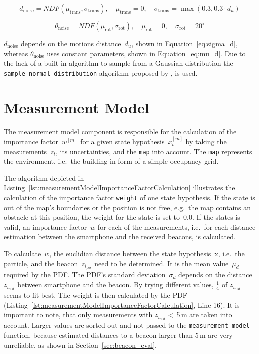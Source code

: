 \begin{equation}\label{eq:sigma_d}
	d_\text{noise} = NDF(\mu_\text{trans}, \sigma_\text{trans}) ,
	\quad \mu_\text{trans} = 0 ,
	 \quad \sigma_{\text{trans}} = \max(0.3, 0.3 \cdot d_u)
\end{equation}

\begin{equation}\label{eq:mu_d}
	\theta_\text{noise} = NDF(\mu_\text{rot}, \sigma_\text{rot}), \quad
	\mu_\text{rot} = 0 , \quad
	\sigma_\text{rot} = 20^{\circ}
\end{equation}

\noindent $d_\text{noise}$ depends on the motions distance~$d_u$, shown in Equation~\ref{eq:sigma_d}, whereas $\theta_\text{noise}$ uses constant parameters, shown in Equation~\ref{eq:mu_d}. Due to the lack of a built-in algorithm to sample from a Gaussian distribution the \texttt{sample\_normal\_distribution} algorithm proposed by \citet[p.~124]{thrun:prob_robo}, is used.


\section{Measurement Model}\label{sec:algo_measurement_model}
The measurement model component is responsible for the calculation of the importance factor~$w^{[m]}$ for a given state hypothesis~$x^{[m]}_t$ by taking the measurements~$z_t$, its uncertainties, and the \texttt{map} into account. The \texttt{map} represents the environment, i.e.\ the building in form of a simple occupancy grid.

The algorithm depicted in Listing~\ref{lst:measurementModelImportanceFactorCalculation} illustrates the calculation of the importance factor \texttt{weight} of one state hypothesis. If the state is out of the map's boundaries or the position is not free, e.g.\ the map contains an obstacle at this position, the weight for the state is set to~0.0. If the states is valid, an importance factor~$w$ for each of the measurements, i.e.\ for each distance estimation between the smartphone and the received beacons, is calculated.



To calculate~$w$, the euclidian distance between the state hypothesis~x, i.e.\ the particle, and  the beacon~$z_{i_\text{pos}}$ need to be determined. It is the mean value~$\mu_d$ required by the \ac{PDF}. The \ac{PDF}'s standard deviation~$\sigma_d$ depends on the distance~$z_{i_\text{dist}}$ between smartphone and the beacon. By trying different values, $\frac{1}{4}$ of $z_{i_\text{dist}}$ seems to fit best. The weight is then calculated by the \ac{PDF} (Listing~\ref{lst:measurementModelImportanceFactorCalculation}, Line 16). It is important to note, that only measurements with $z_{i_\text{dist}} <$\,5\,m are taken into account. Larger values are sorted out and not passed to the \texttt{measurement\_model} function, because estimated distances to a beacon larger than 5\,m are very unreliable, as shown in Section~\ref{sec:beacon_eval}.

